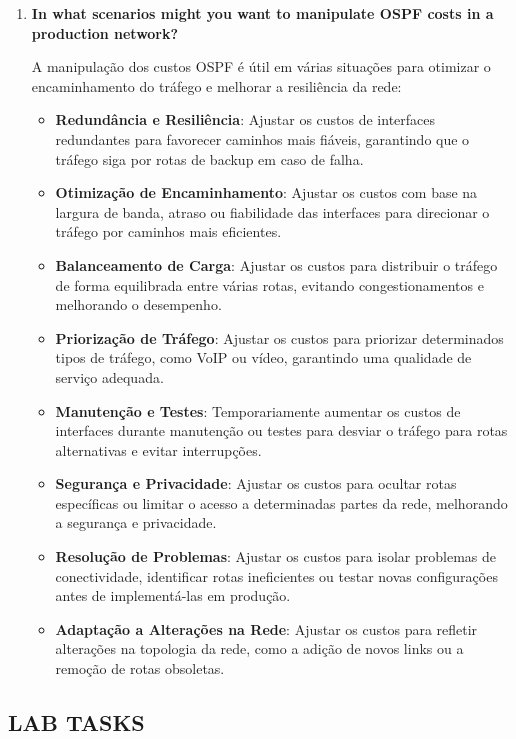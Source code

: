 \documentclass[11pt,english, openright, oneside]{book}
\begin{document}
\begin{enumerate}
  \newpage
  \item \textbf{In what scenarios might you want to manipulate OSPF costs in a production network?}
  \vspace{0.2cm}

  A manipulação dos custos OSPF é útil em várias situações para otimizar o encaminhamento do tráfego e melhorar a resiliência da rede:
  \vspace{0.2cm}

  \begin{itemize}
    \item \textbf{Redundância e Resiliência}: Ajustar os custos de interfaces redundantes para favorecer caminhos mais fiáveis, garantindo que o tráfego siga por rotas de backup em caso de falha.
    \item \textbf{Otimização de Encaminhamento}: Ajustar os custos com base na largura de banda, atraso ou fiabilidade das interfaces para direcionar o tráfego por caminhos mais eficientes.
    \item \textbf{Balanceamento de Carga}: Ajustar os custos para distribuir o tráfego de forma equilibrada entre várias rotas, evitando congestionamentos e melhorando o desempenho.
    \item \textbf{Priorização de Tráfego}: Ajustar os custos para priorizar determinados tipos de tráfego, como VoIP ou vídeo, garantindo uma qualidade de serviço adequada.
    \item \textbf{Manutenção e Testes}: Temporariamente aumentar os custos de interfaces durante manutenção ou testes para desviar o tráfego para rotas alternativas e evitar interrupções.
    \item \textbf{Segurança e Privacidade}: Ajustar os custos para ocultar rotas específicas ou limitar o acesso a determinadas partes da rede, melhorando a segurança e privacidade.
    \item \textbf{Resolução de Problemas}: Ajustar os custos para isolar problemas de conectividade, identificar rotas ineficientes ou testar novas configurações antes de implementá-las em produção.
    \item \textbf{Adaptação a Alterações na Rede}: Ajustar os custos para refletir alterações na topologia da rede, como a adição de novos links ou a remoção de rotas obsoletas.
  \end{itemize}
\end{enumerate}
\vspace{0.2cm}

\subsection{LAB TASKS}
\vspace{0.2cm}
\end{document}
